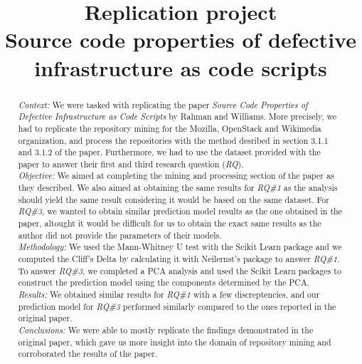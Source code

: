 \documentclass[conference]{IEEEtran}
\begin{document}
\title{Replication project\\
{\footnotesize Source code properties of defective infrastructure as code scripts}
}

\author{
    \and
}

\maketitle

\begin{abstract}
    \textit{Context:} We were tasked with replicating the paper \textit{Source Code Properties of Defective Infrastructure as Code Scripts} by Rahman and Williams. More precisely, we had to replicate the repository mining for the Mozilla, OpenStack and Wikimedia organization, and process the repositories with the method desribed in section 3.1.1 and 3.1.2 of the paper. Furthermore, we had to use the dataset provided with the paper to answer their first and third research question (\textit{RQ}). \\
    \textit{Objective:} We aimed at completing the mining and processing section of the paper as they described. We also aimed at obtaining the same results for \textit{RQ\#1} as the analysis should yield the same result considering it would be based on the same dataset. For \textit{RQ\#3}, we wanted to obtain similar prediction model results as the one obtained in the paper, altought it would be difficult for us to obtain the exact same results as the author did not provide the parameters of their models. \\
    \textit{Methodology:} We used the Mann-Whitney U test with the Scikit
    Learn package and we computed the Cliff’s Delta by calculating it with Neilernst’s package to answer \textit{RQ\#1}. To answer \textit{RQ\#3}, we completed a PCA analysis and used the Scikit Learn packages to construct the prediction model using the components determined by the PCA.\\
    \textit{Results:} We obtained similar results for \textit{RQ\#1} with a few discreptencies, and our prediction model for \textit{RQ\#3} performed similarly compared to the ones reported in the original paper. \\
    \textit{Conclusions:} We were able to mostly replicate the findings demonstrated in the original paper, which gave us more insight into the domain of repository mining and corroborated the results of the paper.\\
\end{abstract}
\end{document}
